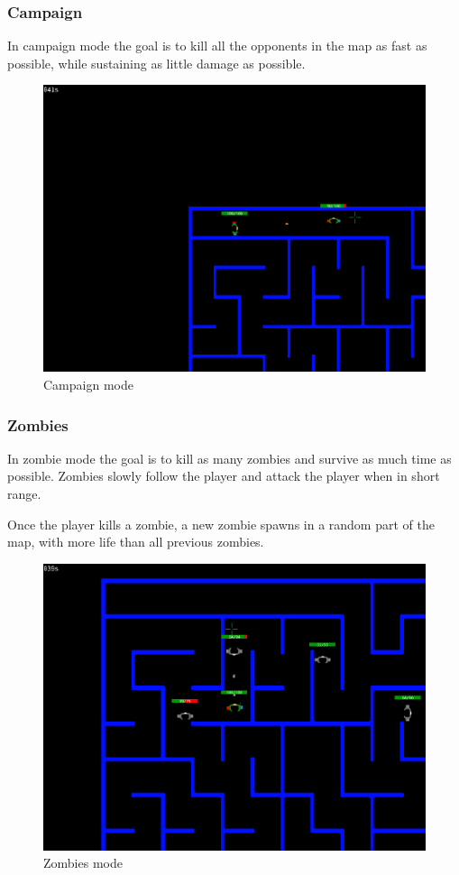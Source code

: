 \documentclass{article}
\theoremstyle{remark}
\begin{document}
\subsubsection{Campaign}
In campaign mode the goal is to kill all the opponents in the map as fast as possible, while sustaining as little damage as possible.
\begin{figure}[H] \centering
	\includegraphics[scale=0.45]{campaign01}
	\caption{Campaign mode}
\end{figure}
\pagebreak
\subsubsection{Zombies}
In zombie mode the goal is to kill as many zombies and survive as much time as possible. Zombies slowly follow the player and attack the player when in short range.\par
Once the player kills a zombie, a new zombie spawns in a random part of the map, with more life than all previous zombies.
\begin{figure}[H] \centering
	\includegraphics[scale=0.45]{zombies01}
	\caption{Zombies mode}
\end{figure}
\pagebreak
\end{document}
